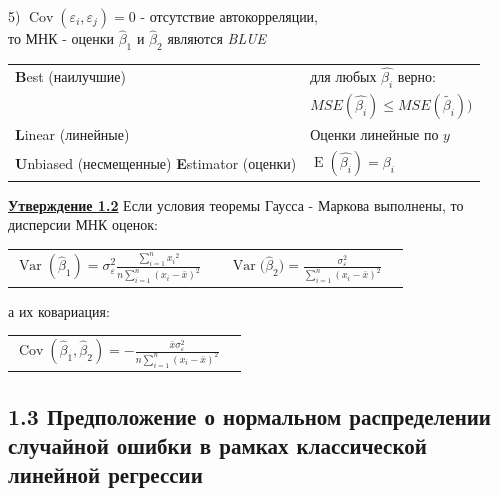 \documentclass[a0,final]{a0poster}
\DeclareMathOperator{\Var}{Var}
\DeclareMathOperator{\Cov}{Cov}
\DeclareMathOperator{\E}{E}
\begin{document}
\begin{multicols}{4}
\begin{tcolorbox}[colback=red!5!white,colframe=red!75!black]
5) $\Cov(\varepsilon_i, \varepsilon_j) = 0$ - отсутствие автокорреляции, \\
то МНК - оценки $\hat{\beta}_1$ и  $\hat{\beta}_2$ являются \textit{BLUE}
 \end{tcolorbox}

\begin{center}
\begin{tabular}{l  l}
\hline
\textbf{B}est (наилучшие) &  для любых $\hat{\beta_i}$ верно: \\
 & $MSE(\hat{\beta_i})\le MSE(\tilde{\beta_i}))$\\
\textbf{L}inear (линейные) & Оценки линейные по $y$\\
\textbf{U}nbiased (несмещенные) \textbf{E}stimator (оценки) & $ \E{(\hat{\beta_i})}=\beta_i$\\
\hline
\end{tabular}
\end{center}

\begin{tcolorbox}[colback=blue!5!white,colframe=blue!75!black]
\textbf{\underline{Утверждение 1.2}} Если условия теоремы Гаусса - Маркова выполнены, то дисперсии МНК оценок:
\begin{center}
\begin{tabular}{r  l}
$\Var{(\hat{\beta}_1)} = \sigma_{\varepsilon}^2 \frac{\sum\limits_{i=1}^n {x_i}^2}{n\sum\limits_{i=1}^n ({x_i}- \bar{x})^2} \qquad \Var{(\hat{\beta}_2}) = \frac{ \sigma_{\varepsilon}^2}{\sum\limits_{i=1}^n ({x_i}- \bar{x})^2}$
\end{tabular}
\end{center}
а их ковариация:
\begin{center}
\begin{tabular}{r  l}
$\Cov(\hat{\beta}_1,\hat{\beta}_2) = - \frac{\bar{x}\sigma_{\varepsilon}^2}{n\sum\limits_{i=1}^n(x_i- \bar{x})^2}$
\end{tabular}
\end{center}
 \end{tcolorbox}


\subsection*{\textbf{1.3 Предположение о нормальном распределении случайной ошибки в рамках классической линейной регрессии}}


\end{multicols}
\end{document}
